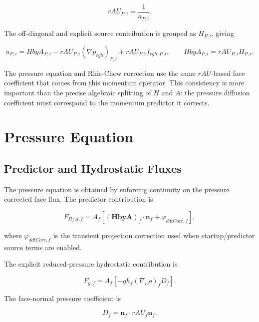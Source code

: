\documentclass[11pt]{article}
\newcommand{\grad}{\nabla}
\begin{document}
\begin{equation}
  rAU_{P,i}=\frac{1}{a_{P,i}}.
\end{equation}

The off-diagonal and explicit source contribution is grouped as \(H_{P,i}\),
giving

\begin{equation}
  u_{P,i}
  =
  HbyA_{P,i}
  -
  rAU_{P,i}(\grad p_{rgh})_{P,i}
  +
  rAU_{P,i}f_{rgh,P,i},
  \qquad
  HbyA_{P,i}=rAU_{P,i}H_{P,i}.
\end{equation}

The pressure equation and Rhie-Chow correction use the same \(rAU\)-based face
coefficient that comes from this momentum operator.  This consistency is more
important than the precise algebraic splitting of \(H\) and \(A\): the pressure
diffusion coefficient must correspond to the momentum predictor it corrects.

\section{Pressure Equation}

\subsection{Predictor and Hydrostatic Fluxes}

The pressure equation is obtained by enforcing continuity on the pressure
corrected face flux.  The predictor contribution is

\begin{equation}
  F_{H/A,f}
  =
  A_f
  \left[
    (\mathbf{HbyA})_f\cdot\mathbf{n}_f
    +
    \varphi_{ddtCorr,f}
  \right],
  \label{eq:fhbya}
\end{equation}

where \(\varphi_{ddtCorr,f}\) is the transient projection correction used when
startup/predictor source terms are enabled.

The explicit reduced-pressure hydrostatic contribution is

\begin{equation}
  F_{g,f}
  =
  A_f
  \left[
    -gh_f
    (\grad_n\rho)_f
    D_f
  \right].
  \label{eq:phig}
\end{equation}

The face-normal pressure coefficient is

\begin{equation}
  D_f=\mathbf{n}_f\cdot rAU_f\mathbf{n}_f.
  \label{eq:pressure-coefficient}
\end{equation}
\end{document}
